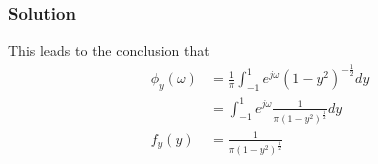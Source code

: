 \documentclass{beamer}
\providecommand{\brak}[1]{\ensuremath{\left(#1\right)}}
\begin{document}
\begin{frame}
\frametitle{Solution}
This leads to the conclusion that 
\begin{align}
 \phi_{y}\brak{\omega} &= \frac{1}{\pi}\int_{-1}^{1}e^{j\omega}\brak{1-y^{2}}^{-\frac{1}{2}} dy\\
 &= \int_{-1}^{1}e^{j\omega}\frac{1}{\pi \brak{1-y^2}^\frac{1}{2}} dy\\
f_{y}\brak{y} &= \frac{1}{\pi \brak{1-y^2}^\frac{1}{2}}
\end{align}

\end{frame}
\end{document}
